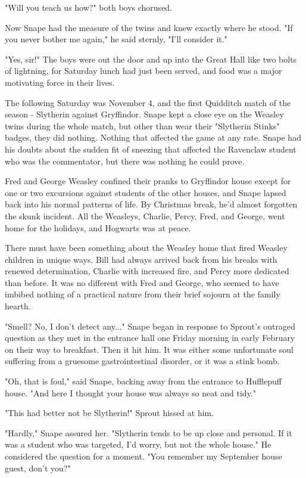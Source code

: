 \documentclass[a4paper,11pt]{article}
\begin{document}
"Will you teach us how?" both boys chorused.

Now Snape had the measure of the twins and knew exactly where he stood. "If you never bother me again," he said sternly, "I'll consider it."

"Yes, sir!" The boys were out the door and up into the Great Hall like two bolts of lightning, for Saturday lunch had just been served, and food was a major motivating force in their lives.

The following Saturday was November 4, and the first Quidditch match of the season - Slytherin against Gryffindor. Snape kept a close eye on the Weasley twins during the whole match, but other than wear their "Slytherin Stinks" badges, they did nothing. Nothing that affected the game at any rate. Snape had his doubts about the sudden fit of sneezing that affected the Ravenclaw student who was the commentator, but there was nothing he could prove.

Fred and George Weasley confined their pranks to Gryffindor house except for one or two excursions against students of the other houses, and Snape lapsed back into his normal patterns of life. By Christmas break, he'd almost forgotten the skunk incident. All the Weasleys, Charlie, Percy, Fred, and George, went home for the holidays, and Hogwarts was at peace.

There must have been something about the Weasley home that fired Weasley children in unique ways. Bill had always arrived back from his breaks with renewed determination, Charlie with increased fire, and Percy more dedicated than before. It was no different with Fred and George, who seemed to have imbibed nothing of a practical nature from their brief sojourn at the family hearth.

"Smell? No, I don't detect any..." Snape began in response to Sprout's outraged question as they met in the entrance hall one Friday morning in early February on their way to breakfast. Then it hit him. It was either some unfortunate soul suffering from a gruesome gastrointestinal disorder, or it was a stink bomb.

"Oh, that is foul," said Snape, backing away from the entrance to Hufflepuff house. "And here I thought your house was always so neat and tidy."

"This had better not be Slytherin!" Sprout hissed at him.

"Hardly," Snape assured her. "Slytherin tends to be up close and personal. If it was a student who was targeted, I'd worry, but not the whole house." He considered the question for a moment. "You remember my September house guest, don't you?"
\end{document}
